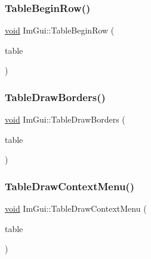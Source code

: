 \mbox{\label{namespaceImGui_ac966c7257f3c3e557170d1f1089cb09a}} 
\subsubsection{\texorpdfstring{Table\+Begin\+Row()}{TableBeginRow()}}
{\footnotesize\ttfamily \hyperlink{imgui__impl__opengl3__loader_8h_ac668e7cffd9e2e9cfee428b9b2f34fa7}{void} Im\+Gui\+::\+Table\+Begin\+Row (\begin{DoxyParamCaption}\item[{\hyperlink{structImGuiTable}{Im\+Gui\+Table} $\ast$}]{table }\end{DoxyParamCaption})}

\mbox{\label{namespaceImGui_a506d5b52f032c72503c4e87535a3d04d}} 
\subsubsection{\texorpdfstring{Table\+Draw\+Borders()}{TableDrawBorders()}}
{\footnotesize\ttfamily \hyperlink{imgui__impl__opengl3__loader_8h_ac668e7cffd9e2e9cfee428b9b2f34fa7}{void} Im\+Gui\+::\+Table\+Draw\+Borders (\begin{DoxyParamCaption}\item[{\hyperlink{structImGuiTable}{Im\+Gui\+Table} $\ast$}]{table }\end{DoxyParamCaption})}

\mbox{\label{namespaceImGui_add4b4da6cea17a33ebbe6b5a55d5fa16}} 
\subsubsection{\texorpdfstring{Table\+Draw\+Context\+Menu()}{TableDrawContextMenu()}}
{\footnotesize\ttfamily \hyperlink{imgui__impl__opengl3__loader_8h_ac668e7cffd9e2e9cfee428b9b2f34fa7}{void} Im\+Gui\+::\+Table\+Draw\+Context\+Menu (\begin{DoxyParamCaption}\item[{\hyperlink{structImGuiTable}{Im\+Gui\+Table} $\ast$}]{table }\end{DoxyParamCaption})}

